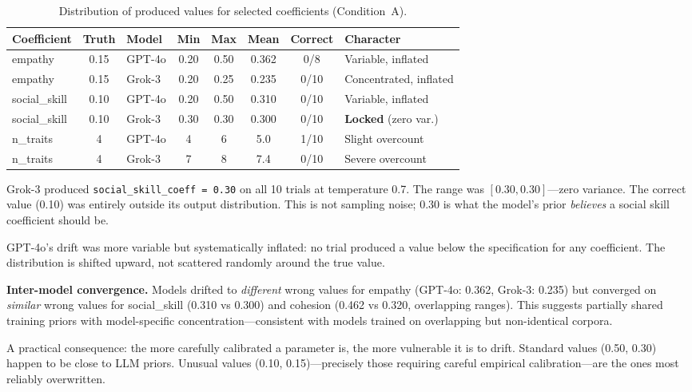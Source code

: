\documentclass[11pt,a4paper]{article}
\begin{document}
\begin{table}[ht]
\centering
\caption{Distribution of produced values for selected coefficients (Condition~A).}
\label{tab:distribution}
\begin{tabular}{@{}lclccccl@{}}
\toprule
Coefficient & Truth & Model & Min & Max & Mean & Correct & Character \\
\midrule
empathy & 0.15 & GPT-4o & 0.20 & 0.50 & 0.362 & 0/8 & Variable, inflated \\
empathy & 0.15 & Grok-3 & 0.20 & 0.25 & 0.235 & 0/10 & Concentrated, inflated \\
social\_skill & 0.10 & GPT-4o & 0.20 & 0.50 & 0.310 & 0/10 & Variable, inflated \\
social\_skill & 0.10 & Grok-3 & 0.30 & 0.30 & 0.300 & 0/10 & \textbf{Locked} (zero var.) \\
n\_traits & 4 & GPT-4o & 4 & 6 & 5.0 & 1/10 & Slight overcount \\
n\_traits & 4 & Grok-3 & 7 & 8 & 7.4 & 0/10 & Severe overcount \\
\bottomrule
\end{tabular}
\end{table}

Grok-3 produced \texttt{social\_skill\_coeff = 0.30} on all 10 trials at temperature 0.7. The range was $[0.30, 0.30]$---zero variance. The correct value (0.10) was entirely outside its output distribution. This is not sampling noise; 0.30 is what the model's prior \textit{believes} a social skill coefficient should be.

GPT-4o's drift was more variable but systematically inflated: no trial produced a value below the specification for any coefficient. The distribution is shifted upward, not scattered randomly around the true value.

\textbf{Inter-model convergence.} Models drifted to \textit{different} wrong values for empathy (GPT-4o: 0.362, Grok-3: 0.235) but converged on \textit{similar} wrong values for social\_skill (0.310 vs 0.300) and cohesion (0.462 vs 0.320, overlapping ranges). This suggests partially shared training priors with model-specific concentration---consistent with models trained on overlapping but non-identical corpora.

A practical consequence: the more carefully calibrated a parameter is, the more vulnerable it is to drift. Standard values (0.50, 0.30) happen to be close to LLM priors. Unusual values (0.10, 0.15)---precisely those requiring careful empirical calibration---are the ones most reliably overwritten.
\end{document}
